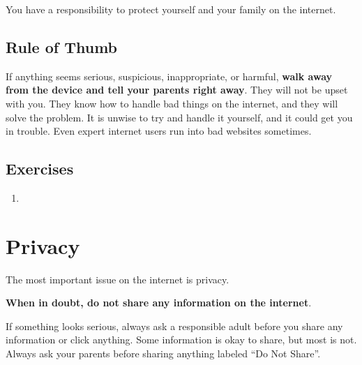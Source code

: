 You have a responsibility to protect yourself and your family on the internet.

\section*{Rule of Thumb}

If anything seems serious, suspicious, inappropriate, or harmful, \textbf{walk away from the device and tell your parents right away}. They will not be upset with you. They know how to handle bad things on the internet, and they will solve the problem. It is unwise to try and handle it yourself, and it could get you in trouble. Even expert internet users run into bad websites sometimes.

\section*{Exercises}

\begin{enumerate}
	\item 
\end{enumerate}


\chapter{Privacy}

The most important issue on the internet is privacy. 

\textbf{When in doubt, do not share any information on the internet}.

If something looks serious, always ask a responsible adult before you share any information or click anything. Some information is okay to share, but most is not. Always ask your parents before sharing anything labeled ``Do Not Share''.

\begin{multicols}{2}
\newcolumn
\end{multicols}

